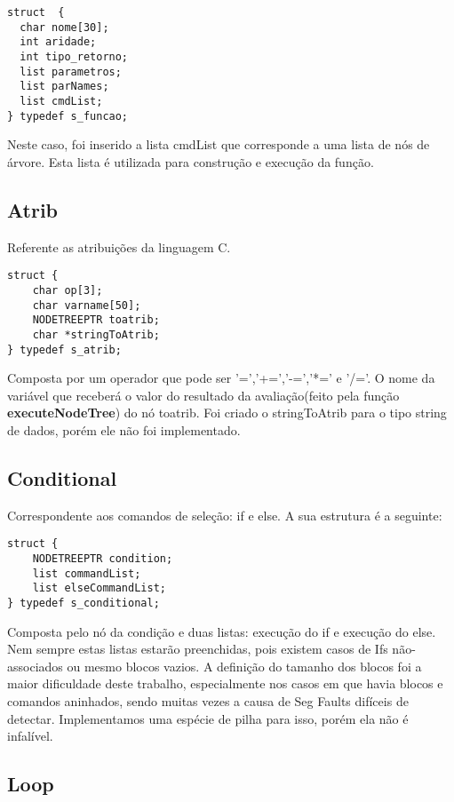\documentclass[a4paper,10pt]{article}
\begin{document}
\begin{lstlisting}
struct  {
  char nome[30];
  int aridade;
  int tipo_retorno;
  list parametros;
  list parNames;
  list cmdList;
} typedef s_funcao;
\end{lstlisting}

Neste caso, foi inserido a lista cmdList que corresponde a uma lista de nós de árvore. Esta lista é utilizada para construção e execução da função.
\subsection{Atrib}

Referente as atribuições da linguagem C. 

\begin{lstlisting}
struct {
	char op[3];
	char varname[50];
	NODETREEPTR toatrib;
	char *stringToAtrib;
} typedef s_atrib;
\end{lstlisting}

Composta por um operador que pode ser '=','+=','-=','*=' e '/='. O nome da variável que receberá o valor do resultado da avaliação(feito pela função \textbf{executeNodeTree}) do nó toatrib. Foi criado o
stringToAtrib para o tipo string de dados, porém ele não foi implementado. 

\subsection{Conditional}

Correspondente aos comandos de seleção: if e else. A sua estrutura é a seguinte:

\begin{lstlisting}
struct {
	NODETREEPTR condition;
	list commandList;
	list elseCommandList;
} typedef s_conditional;
\end{lstlisting}

Composta pelo nó da condição e duas listas: execução do if e execução do else. Nem sempre estas listas estarão preenchidas, pois existem casos de Ifs
não-associados ou mesmo blocos vazios. A definição do tamanho dos blocos foi a maior dificuldade deste trabalho, especialmente nos casos em que havia
blocos e comandos aninhados, sendo muitas vezes a causa de Seg Faults difíceis de detectar. Implementamos uma espécie de pilha para isso, porém ela não é infalível. 

\subsection{Loop}
\end{document}
